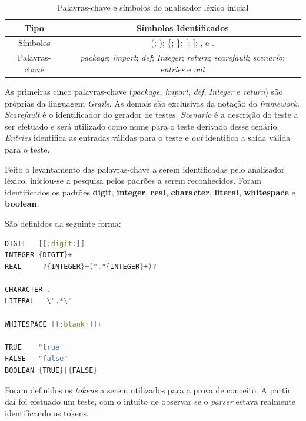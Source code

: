 \begin{table}[h]
  \tiny
  \centering
  \caption{Palavras-chave e símbolos do analisador léxico inicial}
  \label{keywords}
  \begin{tabular}{| c | c |}
    \hline
    Tipo & Símbolos Identificados\\ \hline
     Símbolos & (;  );  \{;  \};  [;  ];  , e . \\
     Palavras-chave &   \textit{package}; \textit{import}; \textit{def}; \textit{Integer}; \textit{return}; \textit{scarefault}; \textit{scenario}; \textit{entries} e \textit{out} \\ \hline
  \end{tabular}
\end{table}
\par
\indent As primeiras cinco palavras-chave (\textit{package}, \textit{import}, \textit{def}, \textit{Integer} e \textit{return}) são próprias da linguagem \textit{Grails}. As demais são exclusivas da notação do \textit{framework}. \textit{Scarefault} é o identificador do gerador de testes. \textit{Scenario} é a descrição do teste a ser efetuado e será utilizado como nome para o teste derivado desse cenário. \textit{Entries} identifica as entradas válidas para o teste e \textit{out} identifica a saída válida para o teste.
\par
\indent Feito o levantamento das palavras-chave a serem identificadas pelo analisador léxico, iniciou-se a pesquisa pelos padrões a serem reconhecidos. Foram identificados os padrões \textbf{digit}, \textbf{integer}, \textbf{real}, \textbf{character}, \textbf{literal}, \textbf{whitespace} e \textbf{boolean}.
\par
\indent São definidos da seguinte forma:
\begin{lstlisting}[language=C++, label=pattern-nominate, caption=Padrões Nominados]
DIGIT   [[:digit:]]
INTEGER {DIGIT}+
REAL    -?{INTEGER}+("."{INTEGER}+)?

CHARACTER .
LITERAL   \".*\"

WHITESPACE [[:blank:]]+

TRUE    "true"
FALSE   "false"
BOOLEAN {TRUE}|{FALSE}
\end{lstlisting}
\par
\indent Foram definidos os \textit{tokens} a serem utilizados para a prova de conceito. A partir daí foi efetuado um teste, com o intuito de observar se o \textit{parser} estava realmente identificando os tokens.
\par
